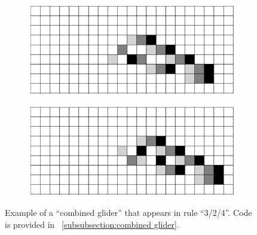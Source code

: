 \documentclass[12pt]{article}
\numberwithin{figure}{section} %
\begin{document}
\begin{figure}[H]
\begin{subfigure}{0.45\textwidth}
     	\subcaption{}
   	\end{subfigure}
	\newline
	\begin{subfigure}{0.45\textwidth}
     	\includegraphics[width=\linewidth]{Section4/35.10}
     	\subcaption{}
   	\end{subfigure}
    	\begin{subfigure}{0.45\textwidth}
     	\includegraphics[width=\linewidth]{Section4/35.11}
     	\subcaption{}
   	\end{subfigure}
   \caption[Example of a "combined glider"]{Example of a “combined glider” that appears in rule “3/2/4”. Code is provided in ~\ref{subsubsection:combined glider}.}
   \label{fig:combined glider}
\end{figure}
\end{document}
